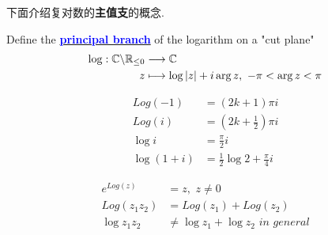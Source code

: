 	\newpage
	下面介绍复对数的\textbf{主值支}的概念.
	\begin{defn}\label{def 3.1.3}
		Define the \underline{\textcolor{blue}{\textbf{principal branch}}} of the logarithm on a "cut plane"
		\begin{align}
			\log : \mathbb{C} \backslash \mathbb{R}_{\leq 0} &\longrightarrow \mathbb{C} \\
			z &\longmapsto \log{\left| z \right|} + i\arg{z} , \,\, -\pi < \arg{z} < \pi
		\end{align}
	\end{defn}

	\vspace{2em}
	\begin{example}\label{ex 3.1.2}
		\begin{align}
			Log(-1) &= (2k + 1)\pi i \\
			Log(i) &= (2k + \frac{1}{2})\pi i \\
			\log{i} &= \frac{\pi}{2}i \\
			\log{(1 + i)} &= \frac{1}{2}\log{2} + \frac{\pi}{4}i
		\end{align}
	\end{example}

	\vspace{2em}
	\begin{proposition}
		\begin{align}
			e^{Log(z)} &= z , \,\, z \neq 0 \\
			Log(z_1 z_2) &= Log(z_1) + Log(z_2) \\
			\log{z_1 z_2} &\neq \log{z_1} + \log{z_2} \,\, in \,\, general
		\end{align}
	\end{proposition}

\newpage

